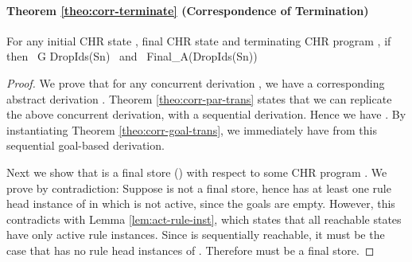 \documentclass{tlp}
\begin{document}
\paragraph{\bf Theorem \ref{theo:corr-terminate} (Correspondence of Termination)}
For any initial CHR state , final CHR state  and
terminating CHR program ,
   \mbox{if }  \partransstar {} \\
   \mbox{then } G \abstransstar DropIds(Sn) \mbox{ and } Final_{\cal A}(DropIds(Sn))
\eda

\begin{proof}
  We prove that for any concurrent derivation ,
  we have a corresponding abstract derivation . Theorem \ref{theo:corr-par-trans}
  states that we can replicate the above concurrent derivation, with a sequential derivation. Hence we have
  . By instantiating Theorem \ref{theo:corr-goal-trans},
  we immediately have  from this sequential goal-based derivation.
  
  Next we show that  is a final store () with respect to some
  CHR program . We prove by contradiction: Suppose  is not a final store, hence 
   has at least one rule head instance  of  in  which is not active,
  since the goals are empty. However, this contradicts with Lemma \ref{lem:act-rule-inst}, which states that
  all reachable states have only active rule instances. Since  is sequentially
  reachable, it must be the case that  has no rule head instances of . Therefore 
  must be a final store.
\end{proof}
\end{document}
